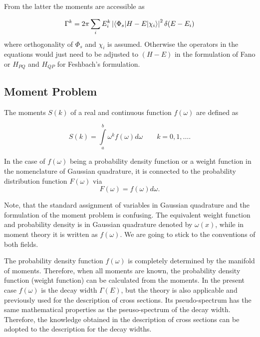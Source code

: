 From the latter the moments are accessible as

\begin{equation}
  \Gamma^k = 2\pi \sum\limits_i E_i^k \left| \braket{\Phi_s|H-E|\chi_i} \right| ^2
           \delta(E-E_i)
\end{equation}
where orthogonality of $\Phi_s$ and $\chi_i$ is assumed. Otherwise the operators
in the equations would just need to be adjusted to $(H-E)$ in the formulation
of Fano or $H_{PQ}$ and $H_{QP}$ for Feshbach's formulation.



\subsection{Moment Problem}

The moments $S(k)$ of a real and continuous function $f(\omega)$ are defined
as \cite{MuellerPlathe90}

\begin{equation}
  S(k) = \int\limits_a^b \omega^k f(\omega) d\omega \quad\quad k=0,1,\dots  .
\end{equation}

In the case of $f(\omega)$ being a probability density function or a weight function
in the nomenclature of Gaussian quadrature, it is connected
to the probability distribution function $F(\omega)$ via
\begin{equation}
  F(\omega) = f(\omega){d\omega} .
\end{equation}

Note, that the standard assignment of variables in Gaussian quadrature and the
formulation of the moment problem is confusing. The equivalent weight function
and probability density is in Gaussian quadrature denoted by $\omega(x)$, while
in moment theory it is written as $f(\omega)$. We are going to stick to the
conventions of both fields.

The probability density function $f(\omega)$ is completely determined by the manifold
of moments. Therefore, when all moments are known, the probability density
function  (weight function) can be calculated from the moments.
In the present case $f(\omega)$
is the decay width $\Gamma(E)$, but the theory is also applicable and previously
used for the description of cross sections. Its pseudo-spectrum has the same
mathematical properties as the pseuso-spectrum of the decay width. Therefore,
the knowledge obtained in the description of cross sections can be adopted to
the description for the decay widths.

